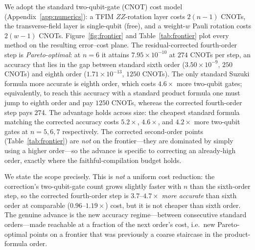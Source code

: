 \documentclass[aps,prresearch,reprint,superscriptaddress,nofootinbib,amsmath,amssymb]{revtex4-2}
\newcommand{\tfim}{TFIM}
\begin{document}


We adopt the standard two-qubit-gate (CNOT) cost model (Appendix~\ref{app:numerics}): a \tfim{} $ZZ$-rotation layer costs $2(n-1)$ CNOTs, the transverse-field layer is single-qubit (free), and a weight-$w$ Pauli rotation costs $2(w-1)$ CNOTs. Figure~\ref{fig:frontier} and Table~\ref{tab:frontier} plot every method on the resulting error--cost plane. The residual-corrected fourth-order step is \emph{Pareto-optimal}: at $n=6$ it attains $7.95\times10^{-10}$ at $274$ CNOTs per step, an accuracy that lies in the gap between standard sixth order ($3.50\times10^{-9}$, $250$ CNOTs) and eighth order ($1.71\times10^{-13}$, $1250$ CNOTs). The only standard Suzuki formula more accurate is eighth order, which costs $4.6\times$ more two-qubit gates; equivalently, to reach this accuracy with a standard product formula one must jump to eighth order and pay $1250$ CNOTs, whereas the corrected fourth-order step pays $274$. The advantage holds across size: the cheapest standard formula matching the corrected accuracy costs $5.2\times$, $4.6\times$, and $4.2\times$ more two-qubit gates at $n=5,6,7$ respectively. The corrected second-order points (Table~\ref{tab:frontier}) are \emph{not} on the frontier---they are dominated by simply using a higher order---so the advance is specific to correcting an already-high order, exactly where the faithful-compilation budget holds.

We state the scope precisely. This is \emph{not} a uniform cost reduction: the correction's two-qubit-gate count grows slightly faster with $n$ than the sixth-order step, so the corrected fourth-order step is $3.7$--$4.7\times$ \emph{more accurate} than sixth order at comparable ($0.96$--$1.19\times$) cost, but it is not cheaper than sixth order. The genuine advance is the new accuracy regime---between consecutive standard orders---made reachable at a fraction of the next order's cost, i.e.\ new Pareto-optimal points on a frontier that was previously a coarse staircase in the product-formula order.
\end{document}
